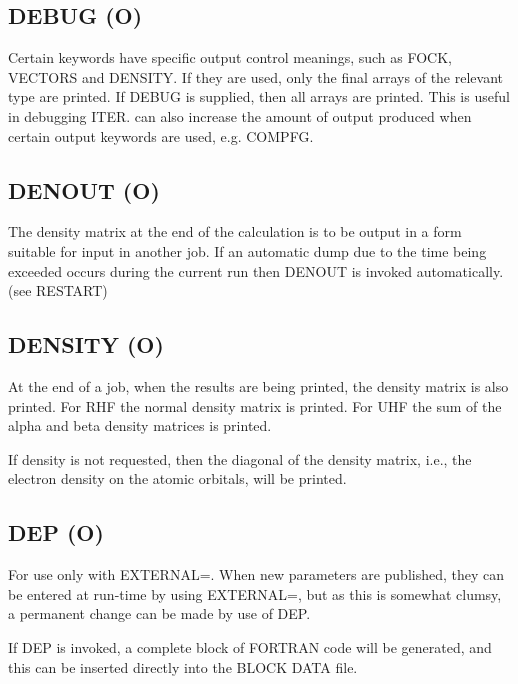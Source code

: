                                    
\subsection*{DEBUG (O)}
        Certain keywords have specific  output  control  meanings,  such  as
   FOCK,  VECTORS  and  DENSITY.  If they are used, only the final arrays of
   the relevant type are printed.  If DEBUG is supplied, then all arrays are
   printed.   This is useful in debugging ITER.  
    can also increase the
   amount of output produced when certain output  keywords  are  used,  e.g.
   COMPFG.


                                  
\subsection*{DENOUT (O)}
        The density matrix at the end of the calculation is to be output  in
   a  form  suitable  for input in another job.  If an automatic dump due to
   the time being exceeded occurs during the  current  run  then  DENOUT  is
   invoked automatically.  (see RESTART)


                                  
\subsection*{DENSITY (O)}
        At the end of a job, when the results are being printed, the density
   matrix  is  also  printed.  For RHF the normal density matrix is printed.
   For UHF the sum of the alpha and beta density matrices is printed.

        If density is not  requested,  then  the  diagonal  of  the  density
   matrix,  i.e.,  the  electron  density  on  the  atomic orbitals, will be
   printed.


\subsection*{DEP (O)}
      For use only with EXTERNAL=.  When  new  parameters  are  published,
 they  can  be  entered  at  run-time  by  using EXTERNAL=, but as this is
 somewhat clumsy, a permanent change can be made by use of DEP.

      If DEP is  invoked,  a  complete  block  of  FORTRAN  code  will  be
 generated, and this can be inserted directly into the BLOCK DATA file.
 
